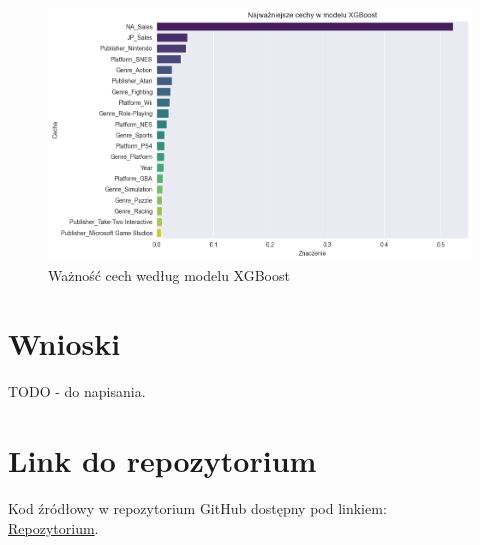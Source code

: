 \documentclass[11pt]{article}
\begin{document}
\begin{figure}[H]
    \centering
    \includegraphics[width=0.9\linewidth]{figures/xgboost-last}
    \caption{Ważność cech według modelu XGBoost}
    \label{fig:xgb_importance-last}
\end{figure}

\section{Wnioski}\label{sec:wnioski}

TODO - do napisania.



\section{Link do repozytorium}\label{sec:link-do-repo}
Kod źródłowy w repozytorium GitHub dostępny pod linkiem: \\
\href{https://github.com/KotZPolibudy/PUT_SUS/tree/main/zdataset-analiza}{Repozytorium}.
\end{document}
